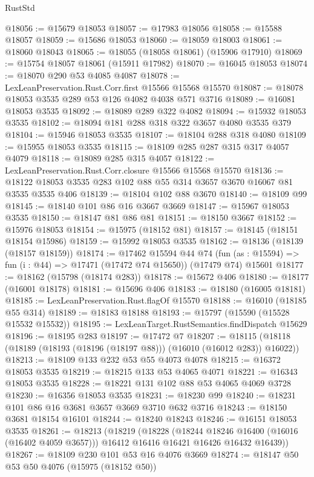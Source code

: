 \begin{lexlean}{RustStd}
\begin{coremodule}
@18056 := @15679 @18053
@18057 := @17983 @18056
@18058 := @15588 @18057
@18059 := @15686 @18053
@18060 := @18059 @18003
@18061 := @18060 @18043
@18065 := @18055 (@18058 @18061) (@15906 @17910)
@18069 := @15754 @18057 @18061 (@15911 @17982)
@18070 := @16045 @18053
@18074 := @18070 @290 @53 @4085 @4087
@18078 := LexLeanPreservation.Rust.Corr.first @15566 @15568 @15570
@18087 := @18078 @18053 @3535 @289 @53 @126 @4082 @4038 @571 @3716
@18089 := @16081 @18053 @3535
@18092 := @18089 @289 @322 @4082
@18094 := @15932 @18053 @3535
@18102 := @18094 @181 @288 @318 @322 @3657 @4080 @3535 @379
@18104 := @15946 @18053 @3535
@18107 := @18104 @288 @318 @4080
@18109 := @15955 @18053 @3535
@18115 := @18109 @285 @287 @315 @317 @4057 @4079
@18118 := @18089 @285 @315 @4057
@18122 := LexLeanPreservation.Rust.Corr.closure @15566 @15568 @15570
@18136 := @18122 @18053 @3535 @283 @102 @88 @55 @314 @3657 @3670 @16067 @81 @3535 @3535 @406
@18139 := @18104 @102 @88 @3670
@18140 := @18109 @99
@18145 := @18140 @101 @86 @16 @3667 @3669
@18147 := @15967 @18053 @3535
@18150 := @18147 @81 @86 @81
@18151 := @18150 @3667
@18152 := @15976 @18053
@18154 := @15975 (@18152 @81)
@18157 := @18145 (@18151 @18154 @15986)
@18159 := @15992 @18053 @3535
@18162 := @18136 (@18139 (@18157 @18159))
@18174 := @17462
    @15594
    @44
    @74
    (fun (as : @15594) => fun (i : @44) => @17471 (@17472 @74 @15650))
    (@17479 @74)
    @15601
@18177 := @18162 (@15798 (@18174 @283))
@18178 := @15672 @406
@18180 := @18177 (@16001 @18178)
@18181 := @15696 @406
@18183 := @18180 (@16005 @18181)
@18185 := LexLeanPreservation.Rust.flagOf @15570
@18188 := @16010 (@18185 @55 @314)
@18189 := @18183 @18188
@18193 := @15797 (@15590 (@15528 @15532 @15532))
@18195 := LexLeanTarget.RustSemantics.findDispatch @15629
@18196 := @18195 @283
@18197 := @17472 @7
@18207 := @18115 (@18118 (@18189 (@18193 (@18196 (@18197 @88))) (@16010 (@16012 @283)) @16022))
@18213 := @18109 @133 @232 @53 @55 @4073 @4078
@18215 := @16372 @18053 @3535
@18219 := @18215 @133 @53 @4065 @4071
@18221 := @16343 @18053 @3535
@18228 := @18221 @131 @102 @88 @53 @4065 @4069 @3728
@18230 := @16356 @18053 @3535
@18231 := @18230 @99
@18240 := @18231 @101 @86 @16 @3681 @3657 @3669 @3710 @632 @3716
@18243 := @18150 @3681 @18154 @16101
@18244 := @18240 @18243
@18246 := @16151 @18053 @3535
@18261 := @18213
    (@18219
      (@18228
        (@18244 @18246 @16400 (@16016 (@16402 @4059 @3657)))
        @16412
        @16416
        @16421
        @16426
        @16432
        @16439))
@18267 := @18109 @230 @101 @53 @16 @4076 @3669
@18274 := @18147 @50 @53 @50 @4076 (@15975 (@18152 @50))

\end{coremodule}
\end{lexlean}
